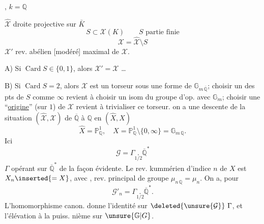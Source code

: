 
, $k=\mathbb Q$

$\widehat{\mathcal X}$ droite projective sur $\bar K$
\[
S\subset\mathcal X(K)\qquad S\text{ partie finie}
\]
\[
\mathcal X=\widehat{\mathcal X}\setminus S
\]
$\mathcal X'$ rev. abélien [modéré] maximal de $\mathcal X$.

A) Si $\operatorname{Card}S\in\{0,1\}$, alors $\mathcal X'=\mathcal X$ \ldots

B) Si $\operatorname{Card}S=2$, alors $\mathcal X$ est  un torseur sous une forme de $\mathbb G_{m\,\overline{\mathbb Q}}$;
 choisir un des pts de $S$ comme $\infty$  revient à choisir un isom du  groupe d'op. avec $\mathbb G_m$; choisir une ``\uline{origine}'' (sur $1$) de $\mathcal X$ revient à trivialiser ce torseur.
  on a une descente de la situation $(\widehat{\mathcal X},\mathcal X)$ de $\overline{\mathbb Q}$ à $\mathbb Q$ en $(\widehat X,X)$
\[
\widehat X=\mathbb P^1_{\mathbb Q},\quad X=\mathbb P^1_{\mathbb Q}\setminus\{0,\infty\}=\mathbb G_{m\,\mathbb Q}.
\]
Ici
\[
\mathcal G=\Gamma\mathbin{\underset{\scriptscriptstyle 1/2}{.}}\overline{\mathbb Q}^{*}
\]
$\Gamma$ opérant sur $\overline{\mathbb Q}^{*}$ de la façon évidente. Le rev. kummérien d'indice $n$ de $X$ est $X_n\inserted{=X}$, avec
,
rev. principal de groupe $\mu_{n\,\mathbb Q}=\mu_n$.
On a, pour
\[
\mathcal G'_n=\Gamma\mathbin{\underset{\scriptscriptstyle 1/2}{.}}\overline{\mathbb Q}^{*}.
\]
L'homomorphisme canon.
donne l'identité sur $\deleted{\unsure{\mathcal G}}\ \Gamma$, et l'élévation à la puiss. nième sur $\unsure{\mathbb G|G}$.
